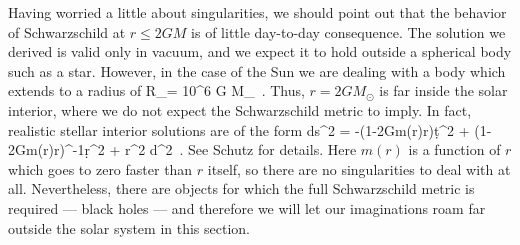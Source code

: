 \documentclass[12pt]{article}
\begin{document}
Having worried a little about singularities, we should point out that
the behavior of Schwarzschild at $r\leq 2GM$ is of little day-to-day
consequence.  The solution we derived is valid only in vacuum, and
we expect it to hold outside a spherical body such as a star.  However,
in the case of the Sun we are dealing with a body which extends to a
radius of
\be
  R_\odot = 10^6 G M_\odot\ .\label{7.31}
\ee
Thus, $r=2GM_\odot$ is far inside the solar interior, where we do not
expect the Schwarzschild metric to imply.  In fact, realistic stellar
interior solutions are of the form
\be
  ds^2 = -\left(1-{{2Gm(r)}\over r}\right)\d t^2 + 
  \left(1-{{2Gm(r)}\over r}\right)^{-1}\d r^2
  + r^2 d\Omega^2\ .\label{7.32}
\ee
See Schutz for details.  Here $m(r)$ is a function of $r$ which goes
to zero faster than $r$ itself, so there are no singularities to 
deal with at all.  Nevertheless, there are objects for which the
full Schwarzschild metric is required --- black holes --- and therefore
we will let our imaginations roam far outside the solar system in this
section.
\end{document}
